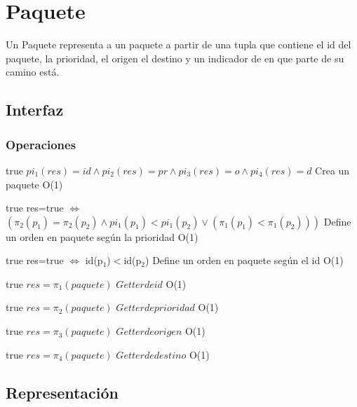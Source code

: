 \section{Paquete}

Un Paquete representa a un paquete a partir de una tupla que contiene el id del paquete, la prioridad, el origen el destino y un indicador de en que parte de su camino est\'a. 

\subsection{Interfaz}



\subsubsection*{Operaciones}

 {true}
 {$pi_1(res)=id \land pi_2(res)=pr \land pi_3(res)=o \land pi_4(res)=d$}
 {Crea un paquete}
 {O(1)}
 {}
 
 {true}
 {res=true $\iff$ $(\pi_2(p_1)=\pi_2(p_2) \land pi_1(p_1)<pi_1(p_2) \lor (\pi_1(p_1)<\pi_1(p_2)))$}
 {Define un orden en paquete seg\'un la prioridad}
 {O(1)}
 {}
 
 {true}
 {res=true $\iff$ id(p$_1$)$<$id(p$_2$)}
 {Define un orden en paquete seg\'un el id}
 {O(1)}
 {}
 
 {true}
 {$res = \pi_1(paquete)$}
 {$Getter de id$}
 {O(1)}
 {}
 
 {true}
 {$res = \pi_2(paquete)$}
 {$Getter de prioridad$}
 {O(1)}
 {}
 
 {true}
 {$res = \pi_3(paquete)$}
 {$Getter de origen$}
 {O(1)}
 {}
 
 {true}
 {$res = \pi_4(paquete)$}
 {$Getter de destino$}
 {O(1)}
 {}
\subsection{Representación}

